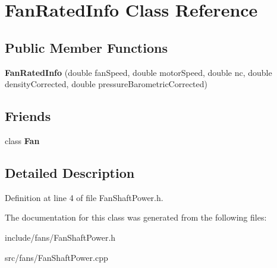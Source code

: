 \hypertarget{class_fan_rated_info}{}\section{Fan\+Rated\+Info Class Reference}
\label{class_fan_rated_info}
\subsection*{Public Member Functions}
\begin{DoxyCompactItemize}
\item 
\mbox{\label{class_fan_rated_info_a3d9f99ac7732f4f9eef9c8a37e12061f}} 
{\bfseries Fan\+Rated\+Info} (double fan\+Speed, double motor\+Speed, double nc, double density\+Corrected, double pressure\+Barometric\+Corrected)
\end{DoxyCompactItemize}
\subsection*{Friends}
\begin{DoxyCompactItemize}
\item 
\mbox{\label{class_fan_rated_info_a0a305abd4183ca4b5d3adb1b563378d7}} 
class {\bfseries Fan}
\end{DoxyCompactItemize}


\subsection{Detailed Description}


Definition at line 4 of file Fan\+Shaft\+Power.\+h.



The documentation for this class was generated from the following files\+:\begin{DoxyCompactItemize}
\item 
include/fans/Fan\+Shaft\+Power.\+h\item 
src/fans/Fan\+Shaft\+Power.\+cpp\end{DoxyCompactItemize}
